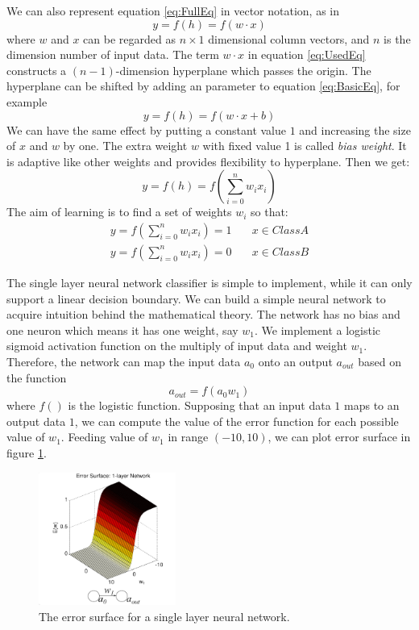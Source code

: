 We can also represent equation \ref{eq:FullEq} in vector notation, as in 
\begin{equation}\label{eq:UsedEq}
y = f(h) = f(w \cdot x)
\end{equation}
where $w$ and $x$ can be regarded as $n\times1$ dimensional column vectors, and $n$ is the dimension number of input data.
The term $w \cdot x$ in equation \ref{eq:UsedEq} constructs a $(n-1)$-dimension hyperplane which passes the origin. The hyperplane can be shifted by adding an parameter to equation \ref{eq:BasicEq}, for example
\begin{equation}\label{eq:WithBias}
y = f(h) = f(w \cdot x + b)
\end{equation}
We can have the same effect by putting a constant value $1$ and increasing the size of $x$ and $w$ by one. The extra weight $w$ with fixed value 1 is called \textit{bias weight}. It is adaptive like other weights and provides flexibility to hyperplane. Then we get:
\begin{equation}\label{eq:finalEq}
y = f(h) = f(\sum_{i=0}^{n}w_{i}x_{i})
\end{equation}
The aim of learning is to find a set of weights $w_{i}$ so that:
\begin{align*}
y = f(\sum_{i=0}^{n}w_{i}x_{i}) = 1  & \quad x \in Class A\\
y = f(\sum_{i=0}^{n}w_{i}x_{i}) = 0  & \quad x \in Class B
\end{align*}

The single layer neural network classifier is simple to implement, while it can only support a linear decision boundary. We can build a simple neural network to acquire intuition behind the mathematical theory. The network has no bias and one neuron which means it has one weight, say $w_{1}$. We implement a logistic sigmoid activation function on the multiply of input data and weight $w_{1}$. Therefore, the network can map the input data $a_0$ onto an output $a_{out}$ based on the function
\begin{equation}\label{eq:1LayerExample}
a_{out} = f(a_{0}w_{1})
\end{equation}
where $f()$ is the logistic function. Supposing that an input data $1$ maps to an output data $1$, we can compute the value of the error function for each possible value of $w_{1}$. Feeding value of $w_{1}$ in range $(-10,10)$, we can plot error surface in figure \ref{fig:1LayerErrorSurface}.
\graphicspath{ {./Figures/} }
\begin{figure}[!htb]
\centering
\includegraphics[width=0.4\textwidth]{1LayerErrorSurface.png}
\caption{\label{fig:1LayerErrorSurface}The error surface for a single layer neural network\citep{ErrorFigure1}.}
\end{figure}

